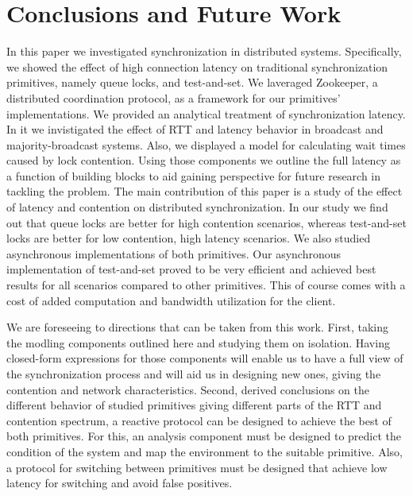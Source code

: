 \section{Conclusions and Future Work}\label{sec:conclusions}
In this paper we investigated synchronization in distributed systems. Specifically, we showed the effect of high connection latency on traditional synchronization primitives, namely queue locks, and test-and-set. We laveraged Zookeeper, a distributed coordination protocol, as a framework for our primitives' implementations. We provided an analytical treatment of synchronization latency. In it we invistigated the effect of RTT and latency behavior in broadcast and majority-broadcast systems. Also, we displayed a model for calculating wait times caused by lock contention. Using those components we outline the full latency as a function of building blocks to aid gaining perspective for future research in tackling the problem. The main contribution of this paper is a study of the effect of latency and contention on distributed synchronization. In our study we find out that queue locks are better for high contention scenarios, whereas test-and-set locks are better for low contention, high latency scenarios. We also studied asynchronous implementations of both primitives. Our asynchronous implementation of test-and-set proved to be very efficient and achieved best results for all scenarios compared to other primitives. This of course comes with a cost of added computation and bandwidth utilization for the client.

We are foreseeing to directions that can be taken from this work. First, taking the modling components outlined here and studying them on isolation. Having closed-form expressions for those components will enable us to have a full view of the synchronization process and will aid us in designing new ones, giving the contention and network characteristics. Second, derived conclusions on the different behavior of studied primitives giving different parts of the RTT and contention spectrum, a reactive protocol can be designed to achieve the best of both primitives. For this, an analysis component must be designed to predict the condition of the system and map the environment to the suitable primitive. Also, a protocol for switching between primitives must be designed that achieve low latency for switching and avoid false positives.

